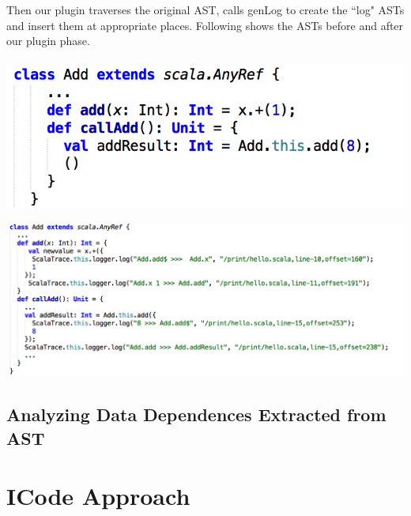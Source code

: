 \documentclass{article}[12pt]
\begin{document}
Then our plugin traverses the original AST, calls genLog to create the ``log" ASTs and insert them at appropriate places. Following shows the ASTs before and after our plugin phase.
\\
\\
\includegraphics[scale=0.5]{figures/figure9}

\includegraphics[scale=0.5]{figures/figure8} 
\subsection{Analyzing Data Dependences Extracted from AST}


\section{ICode Approach}
\end{document}
